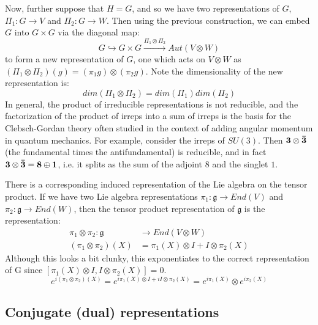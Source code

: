 \documentclass[11pt, oneside]{article}   	%
\theoremstyle{definition}
\begin{document}
Now, further suppose that $H = G$, and so we have two representations of $G$, $\Pi_1 : G\rightarrow V$ 
and $\Pi_2 : G\rightarrow W$. Then using the previous construction, we can embed $G$ into $G\times G$ 
via the diagonal map:
\begin{equation}
	G\hookrightarrow G\times G \xrightarrow{\Pi_1\otimes\Pi_2} Aut(V\otimes W)
\end{equation}
to form a new representation of $G$, one which acts on $V\otimes W$ as $(\Pi_1\otimes\Pi_2)(g) = 
(\pi_1 g)\otimes (\pi_2 g)$. Note the dimensionality of the new representation is: 
\begin{equation}
	dim(\Pi_1\otimes\Pi_2) = dim(\Pi_1)dim(\Pi_2)
\end{equation}
In general, the product of irreducible representations is not reducible, and 
the factorization of the product of irreps into a sum of irreps is the basis for the Clebsch-Gordan theory 
often studied in the context of adding angular momentum in quantum mechanics. For example, consider 
the irreps of $SU(3)$. Then $\bf 3\otimes\bar 3$ (the fundamental times the antifundamental) is reducible, 
and in fact $\bf 3\otimes\bar 3 = 8\oplus 1$, i.e. it splits as the sum of the adjoint $8$ and the singlet $1$. 

There is a corresponding induced representation of the Lie algebra on the tensor product. If we have two 
Lie algebra representations $\pi_1 : \mathfrak g\rightarrow End(V)$ and $\pi_2 : \mathfrak g\rightarrow End(W)$, 
then the tensor product representation of $\mathfrak g$ is the representation:
\begin{align}
	\pi_1\otimes\pi_2: \mathfrak g &\rightarrow End(V\otimes W)\\
	(\pi_1\otimes\pi_2)(X) &= \pi_1(X)\otimes I + I\otimes\pi_2(X)
\end{align}
Although this looks a bit clunky, this exponentiates to the correct representation of G since $[\pi_1(X)\otimes I, 
I\otimes\pi_2(X)] = 0$.
\begin{equation}
	e^{i(\pi_1\otimes\pi_2)(X)} = e^{i\pi_1(X)\otimes I + iI\otimes\pi_2(X)} = e^{i\pi_1(X)}\otimes e^{i\pi_2(X)}
\end{equation}

\subsection{Conjugate (dual) representations}
\end{document}
